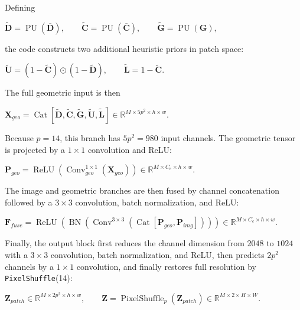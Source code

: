 Defining
\begin{center}
    $\displaystyle
    \tilde{\mathbf{D}}=\operatorname{PU}(\bar{\mathbf{D}}),\qquad
    \tilde{\mathbf{C}}=\operatorname{PU}(\bar{\mathbf{C}}),\qquad
    \tilde{\mathbf{G}}=\operatorname{PU}(\mathbf{G}),
    $
\end{center}
the code constructs two additional heuristic priors in patch space:
\begin{center}
    $\displaystyle
    \tilde{\mathbf{U}} = (1-\tilde{\mathbf{C}})\odot(1-\tilde{\mathbf{D}}), \qquad
    \tilde{\mathbf{L}} = 1-\tilde{\mathbf{C}}.
    $
\end{center}
The full geometric input is then
\begin{center}
    $\displaystyle
    \mathbf{X}_{geo}
    =
    \operatorname{Cat}
    \left[
    \tilde{\mathbf{D}},
    \tilde{\mathbf{C}},
    \tilde{\mathbf{G}},
    \tilde{\mathbf{U}},
    \tilde{\mathbf{L}}
    \right]
    \in \mathbb{R}^{M\times 5p^2\times h\times w}.
    $
\end{center}
Because $p=14$, this branch has $5p^2=980$ input channels. The geometric tensor is projected by a $1\times 1$ convolution and ReLU:
\begin{center}
    $\displaystyle
    \mathbf{P}_{geo}
    =
    \operatorname{ReLU}\!\left(\operatorname{Conv}^{1\times1}_{geo}(\mathbf{X}_{geo})\right)
    \in \mathbb{R}^{M\times C_e\times h\times w}.
    $
\end{center}
The image and geometric branches are then fused by channel concatenation followed by a $3\times 3$ convolution, batch normalization, and ReLU:
\begin{center}
    $\displaystyle
    \mathbf{F}_{fuse}
    =
    \operatorname{ReLU}
    \left(
    \operatorname{BN}
    \left(
    \operatorname{Conv}^{3\times3}
    \left(
    \operatorname{Cat}[\mathbf{P}_{geo},\mathbf{P}_{img}]
    \right)
    \right)
    \right)
    \in \mathbb{R}^{M\times C_e\times h\times w}.
    $
\end{center}
Finally, the output block first reduces the channel dimension from $2048$ to $1024$ with a $3\times 3$ convolution, batch normalization, and ReLU, then predicts $2p^2$ channels by a $1\times 1$ convolution, and finally restores full resolution by \texttt{PixelShuffle}(14):
\begin{center}
    $\displaystyle
    \mathbf{Z}_{patch}\in\mathbb{R}^{M\times 2p^2\times h\times w},
    \qquad
    \mathbf{Z}=\operatorname{PixelShuffle}_{p}(\mathbf{Z}_{patch})
    \in\mathbb{R}^{M\times 2\times H\times W}.
    $
\end{center}
